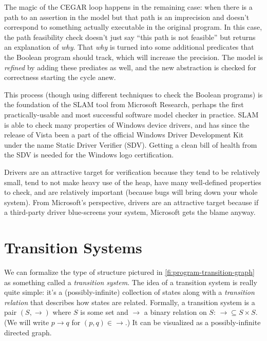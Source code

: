 \documentclass{article}
\newenvironment{sidebar}{}{}
\begin{document}
\begin{sidebar}
The magic of the CEGAR loop happens in the remaining case: when there
is a path to an assertion in the model but that path is an imprecision
and doesn't correspond to something actually executable in the
original program. In this case, the path feasibility check doesn't
just say ``this path is not feasible'' but returns an explanation of
\emph{why}. That \emph{why} is turned into some additional predicates
that the Boolean program should track, which will increase the
precision. The model is \emph{refined} by adding these prediates as
well, and the new abstraction is checked for correctness starting the
cycle anew.

This process (though using different techniques to check the Boolean
programs) is the foundation of the SLAM tool from Microsoft Research,
perhaps the first practically-usable and most successful software
model checker in practice. SLAM is able to check many properties of
Windows device drivers, and has since the release of Vista been a part
of the official Windows Driver Development Kit under the name Static
Driver Verifier (SDV). Getting a clean bill of health from the SDV is
needed for the Windows logo certification.

Drivers are an attractive target for verification because they tend to
be relatively small, tend to not make heavy use of the heap, have many
well-defined properties to check, and are relatively important
(because bugs will bring down your whole system). From Microsoft's
perspective, drivers are an attractive target because if a third-party
driver blue-screens your system, Microsoft gets the blame anyway.
\end{sidebar}


\section{Transition Systems}
We can formalize the type of structure pictured in
\cref{fi:program-transition-graph} as something called a \emph{transition
  system}. The idea of a transition system is really quite simple:
it's a (possibly-infinite) collection of states along with a
\emph{transition relation} that describes how states are
related. Formally, a transition system is a pair $(S, \rightarrow)$
where $S$ is some set and $\rightarrow$ a binary relation on $S$:
$\rightarrow \subseteq S \times S$. (We will write $p \rightarrow q$
for $(p, q) \in \rightarrow$.) It can be visualized as a
possibly-infinite directed graph.
\end{document}
